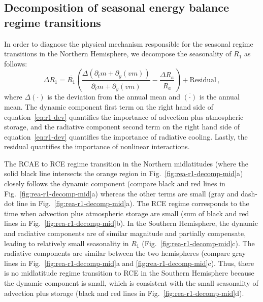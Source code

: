 \documentclass{ametsocV5}
\begin{document}
    \subsection{Decomposition of seasonal energy balance regime transitions}
    In order to diagnose the physical mechanism responsible for the seasonal regime transitions in the Northern Hemisphere, we decompose the seasonality of $R_1$ as follows:
    \begin{equation}\label{eq:r1-dev}
      \Delta R_1 = \overline{R_1}\left( \frac{\Delta(\partial_t m + \partial_y (vm))}{\overline{\partial_t m + \partial_y (vm)}}  - \frac{\Delta R_a }{\overline{R_a}}\right) + \mathrm{Residual} \, ,
    \end{equation}
    where $\Delta(\cdot)$ is the deviation from the annual mean and $\overline{(\cdot)}$ is the annual mean. The dynamic component \replaced{[}{(}first term on the right hand side of equation~\added{(}\ref{eq:r1-dev}\added{)}\replaced{]}{)} quantifies the importance of advection plus atmospheric storage, and the radiative component \replaced{[}{(}second term on the right hand side of equation~\added{(}\ref{eq:r1-dev}\added{)}\replaced{]}{)} quantifies the importance of radiative cooling. Lastly, the residual quantifies the importance of nonlinear interactions.

    The RCAE to RCE regime transition in the Northern midlatitudes (where the solid black line intersects the orange region in Fig.~\ref{fig:rea-r1-decomp-mid}a) closely follows the dynamic component (compare black and red lines in Fig.~\ref{fig:rea-r1-decomp-mid}a) whereas the other terms are small (gray and dash-dot line in Fig.~\ref{fig:rea-r1-decomp-mid}a). The RCE regime corresponds to the time when advection plus atmospheric storage are small (sum of black and red lines in Fig.~\ref{fig:rea-r1-decomp-mid}b). In the Southern Hemisphere, the dynamic and radiative components are of similar magnitude and partially compensate, leading to relatively small seasonality in $R_1$ (Fig.~\ref{fig:rea-r1-decomp-mid}c). The radiative components are similar between the two hemispheres (compare gray lines in Fig.~\ref{fig:rea-r1-decomp-mid}a and \ref{fig:rea-r1-decomp-mid}c). Thus, there is no midlatitude regime transition to RCE in the Southern Hemisphere because the dynamic component is small, which is consistent with the small seasonality of advection plus storage (black and red lines in Fig.~\ref{fig:rea-r1-decomp-mid}d).
\end{document}
